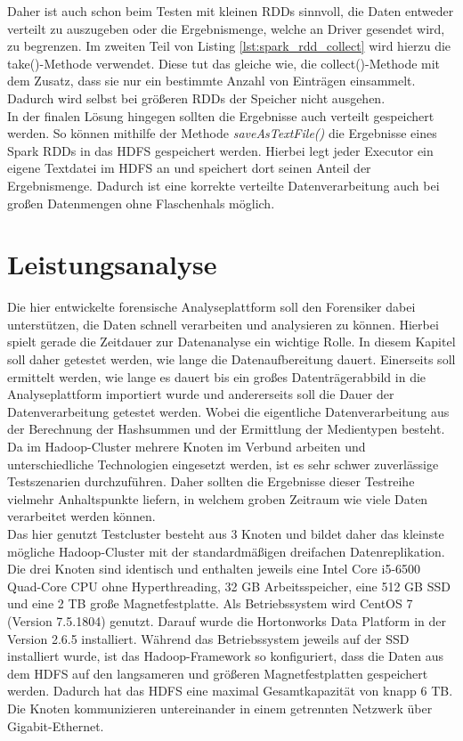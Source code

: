 \noindent
Daher ist auch schon beim Testen mit kleinen RDDs sinnvoll, die Daten entweder verteilt zu auszugeben oder die Ergebnismenge, welche an Driver gesendet wird, zu begrenzen. Im zweiten Teil von Listing \ref{lst:spark_rdd_collect}  wird hierzu die take()-Methode verwendet. Diese tut das gleiche wie, die collect()-Methode mit dem Zusatz, dass sie nur ein bestimmte Anzahl von Einträgen einsammelt. Dadurch wird selbst bei größeren RDDs der Speicher nicht ausgehen.\\
In der finalen Lösung hingegen sollten die Ergebnisse auch verteilt gespeichert werden.  So können mithilfe der Methode \textit{saveAsTextFile()} die Ergebnisse eines Spark RDDs in das HDFS gespeichert werden. Hierbei legt jeder Executor ein eigene Textdatei im HDFS an und speichert dort seinen Anteil der Ergebnismenge. Dadurch ist eine korrekte verteilte Datenverarbeitung auch bei großen Datenmengen ohne Flaschenhals möglich. 


\section{Leistungsanalyse}
\label{sec:performance_analysis}
Die hier entwickelte forensische Analyseplattform soll den Forensiker dabei unterstützen, die Daten schnell verarbeiten und analysieren zu können. Hierbei spielt gerade die Zeitdauer zur Datenanalyse ein wichtige Rolle. In diesem Kapitel soll daher getestet werden, wie lange die Datenaufbereitung dauert. Einerseits soll ermittelt werden, wie lange es dauert bis ein großes Datenträgerabbild in die Analyseplattform importiert wurde und andererseits soll die Dauer der Datenverarbeitung getestet werden. Wobei die eigentliche Datenverarbeitung aus der Berechnung der Hashsummen und der Ermittlung der Medientypen besteht.\\

\noindent
Da im Hadoop-Cluster mehrere Knoten im Verbund arbeiten und unterschiedliche Technologien eingesetzt werden, ist es sehr schwer zuverlässige Testszenarien durchzuführen. Daher sollten die Ergebnisse dieser Testreihe vielmehr Anhaltspunkte liefern, in welchem groben Zeitraum wie viele Daten verarbeitet werden können.\\
Das hier genutzt Testcluster besteht aus 3 Knoten und bildet daher das kleinste mögliche Hadoop-Cluster mit der standardmäßigen dreifachen Datenreplikation. Die drei Knoten sind identisch und enthalten jeweils eine Intel Core i5-6500 Quad-Core CPU ohne Hyperthreading, 32 GB Arbeitsspeicher, eine 512 GB SSD und eine 2 TB große Magnetfestplatte. Als Betriebssystem wird CentOS 7 (Version 7.5.1804) genutzt. Darauf wurde die Hortonworks Data Platform in der Version 2.6.5 installiert. Während das Betriebssystem jeweils auf der SSD installiert wurde, ist das Hadoop-Framework so konfiguriert, dass die Daten aus dem HDFS auf den langsameren und größeren Magnetfestplatten gespeichert werden. Dadurch hat das HDFS eine maximal Gesamtkapazität von knapp 6 TB. Die Knoten kommunizieren untereinander in einem getrennten Netzwerk über Gigabit-Ethernet.\\  

